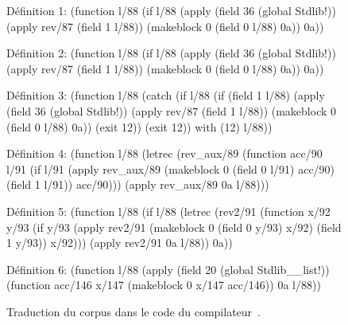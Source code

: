 \begin{figure}
\begin{lisp}
Définition 1: (function l/88 (if l/88
    (apply (field 36 (global Stdlib!)) (apply rev/87 (field 1 l/88))
      (makeblock 0 (field 0 l/88) 0a))
    0a))

Définition 2: (function l/88 (if l/88
    (apply (field 36 (global Stdlib!)) (apply rev/87 (field 1 l/88))
      (makeblock 0 (field 0 l/88) 0a))
    0a))

Définition 3: (function l/88 (catch
    (if l/88
      (if (field 1 l/88)
        (apply (field 36 (global Stdlib!)) (apply rev/87 (field 1 l/88))
          (makeblock 0 (field 0 l/88) 0a))
        (exit 12))
      (exit 12))
   with (12) l/88))

Définition 4: (function l/88 (letrec (rev_aux/89
       (function acc/90 l/91
         (if l/91
           (apply rev_aux/89 (makeblock 0 (field 0 l/91) acc/90)
             (field 1 l/91))
           acc/90)))
    (apply rev_aux/89 0a l/88)))

Définition 5: (function l/88 (if l/88
    (letrec (rev2/91
         (function x/92 y/93
           (if y/93
             (apply rev2/91 (makeblock 0 (field 0 y/93) x/92) (field 1 y/93))
             x/92)))
      (apply rev2/91 0a l/88))
    0a))

Définition 6: (function l/88 (apply (field 20 (global Stdlib__list!))
    (function acc/146 x/147 (makeblock 0 x/147 acc/146)) 0a l/88))
\end{lisp}
\caption{Traduction du corpus dans le code {\LambdaCode} du compilateur~\OCaml.}
\label{fig:lambda-corpus}
\end{figure}
